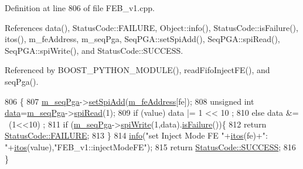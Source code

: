 Definition at line 806 of file F\+E\+B\+\_\+v1.\+cpp.



References data(), Status\+Code\+::\+F\+A\+I\+L\+U\+RE, Object\+::info(), Status\+Code\+::is\+Failure(), itos(), m\+\_\+fe\+Address, m\+\_\+seq\+Pga, Seq\+P\+G\+A\+::set\+Spi\+Add(), Seq\+P\+G\+A\+::spi\+Read(), Seq\+P\+G\+A\+::spi\+Write(), and Status\+Code\+::\+S\+U\+C\+C\+E\+SS.



Referenced by B\+O\+O\+S\+T\+\_\+\+P\+Y\+T\+H\+O\+N\+\_\+\+M\+O\+D\+U\+L\+E(), read\+Fifo\+Inject\+F\+E(), and seq\+Pga().


\begin{DoxyCode}
806                                                       \{
807   \hyperlink{classFEB__v1_a6c7804ac86796f233a8393043adf2e77}{m\_seqPga}->\hyperlink{classSeqPGA_ac998ce3a6d9b5f2e88cc8393f8c1df53}{setSpiAdd}(\hyperlink{classFEB__v1_a4e1945c2d5b434125f375e9d0fc6d99f}{m\_feAddress}[fe]);
808   \textcolor{keywordtype}{unsigned} \textcolor{keywordtype}{int} \hyperlink{classFEB__v1_a6bca4320bd3bbbc32efc81097f33421a}{data}=\hyperlink{classFEB__v1_a6c7804ac86796f233a8393043adf2e77}{m\_seqPga}->\hyperlink{classSeqPGA_ab3d0e5e5d4014bc7a92588a76b8713d4}{spiRead}(1);
809   \textcolor{keywordflow}{if} (value)  data |= 1 << 10 ;
810   \textcolor{keywordflow}{else}        data &= ~(1<<10) ;
811   \textcolor{keywordflow}{if} (\hyperlink{classFEB__v1_a6c7804ac86796f233a8393043adf2e77}{m\_seqPga}->\hyperlink{classSeqPGA_ad4421841ce4ce8b88ad13f63216f0743}{spiWrite}(1,data).\hyperlink{classStatusCode_a5dd22dc6eb2c52fc4cabc58f6dea2eb7}{isFailure}())\{
812     \textcolor{keywordflow}{return} \hyperlink{classStatusCode_a6f565cbeadc76d14c72f047e5e85eb4ba3da73d4c469762eb9d3c960368252b26}{StatusCode::FAILURE};
813   \}
814   \hyperlink{classObject_a644fd329ea4cb85f54fa6846484b84a8}{info}(\textcolor{stringliteral}{"set Inject Mode FE "}+\hyperlink{Tools_8h_af330027dbdafb9a30768b3613c553e60}{itos}(fe)+\textcolor{stringliteral}{": "}+\hyperlink{Tools_8h_af330027dbdafb9a30768b3613c553e60}{itos}(value),\textcolor{stringliteral}{"FEB\_v1::injectModeFE"});
815   \textcolor{keywordflow}{return} \hyperlink{classStatusCode_a6f565cbeadc76d14c72f047e5e85eb4badd0da38d3ba0d922efd1f4619bc37ad8}{StatusCode::SUCCESS};
816 \}
\end{DoxyCode}
\mbox{\label{classFEB__v1_ae3252ed2737b5c93395da201b427b871}} 
